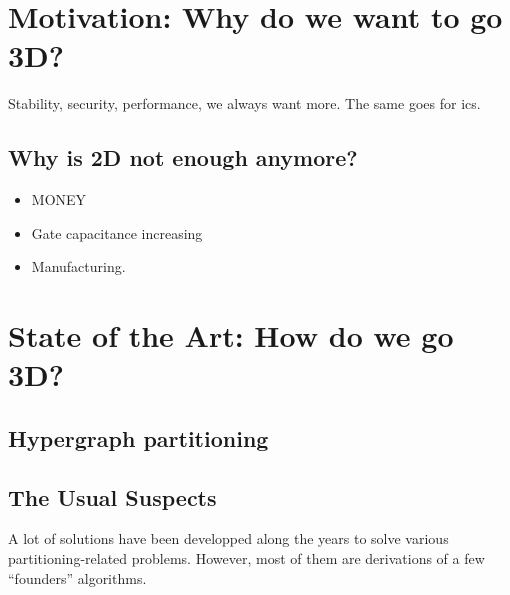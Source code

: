 \documentclass[11pt,a4paper]{article}
\theoremstyle{customdef}
\begin{document}

\section{Motivation: Why do we want to go 3D?}

Stability, security, performance, we always want more.
The same goes for \glspl{ic}.


\subsection{Why is 2D not enough anymore?}
\begin{itemize}
	\item MONEY
	\item Gate capacitance increasing
	\item Manufacturing. 
\end{itemize}







\section{State of the Art: How do we go 3D?}
\subsection{Hypergraph partitioning}

\subsection{The Usual Suspects}
A lot of solutions have been developped along the years to solve various partitioning-related problems.
However, most of them are derivations of a few “founders” algorithms.
\end{document}
